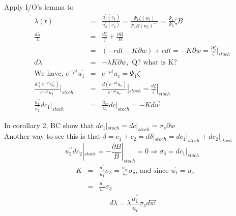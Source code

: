 \documentclass[]{article}
\begin{document}
Apply I/O's lemma to 
\begin{eqnarray*}
\lambda(t) &=& \frac{u_1^\prime(c_1^\prime)}{u_2^\prime(c_2^\prime)} = \frac{\Psi_1 \zeta(w_t)}{\Psi_2B(w_t)^{-1}} = \frac{\Psi_1}{\Psi_2} \zeta B\\
\frac{d\lambda}{\lambda} &=& \frac{d\zeta}{\zeta} + \frac{\partial B}{B}\\
&=& (-r dt - K\partial w) + rdt = -K\partial w = \frac{\partial \zeta}{\zeta}|_{stoch}\\
d\lambda &=& -\lambda K \partial w, \mbox{ Q? what is K?}\\
\mbox{We have, } e^{-\rho t} u_1^\prime &=& e^{-\rho t} u_c = \Psi_1 \zeta\\
\frac{d(e^{-\rho t}u_1^\prime)}{e^{-\rho t}u_1^\prime}|_{stoch} &=& \frac{d(e^{-\rho t}u_c)}{e^{-\rho t}u_c}|_{stoch} = \frac{d\zeta}{\zeta}|_{stoch}\\
\frac{u_1^{\prime\prime}}{u_1^\prime}dc_1|_{stoch}&=& \frac{u_{cc}}{u_c}dc|_{stoch} = -Kd\vec{w}
\end{eqnarray*}

In corollary 2, BC show that $dc_1|_{stoch} = dc|_{stoch} = \sigma_s \partial w$\\
Another way to see this is that $\delta = c_1+c_2 = d\delta|_{stoch} = dc_1|_{stoch} + dc_2|_{stoch}$
\begin{equation}
u_2^{\prime\prime} dc_2|_{stoch} = -\frac{\partial B}{B}|_{stoch} = 0 \Rightarrow \sigma_\delta = dc_1|_{stoch} \tag{22}
\end{equation}
\begin{eqnarray*}
-K&=& \frac{u_1^{\prime\prime}}{u_1^\prime} \sigma_\delta = \frac{u_{cc}}{u_c}\sigma_\delta \mbox{, and since } u_1^\prime = u_c\\
&=& \frac{u_1^{\prime\prime}}{u_c} \sigma_\delta
\end{eqnarray*}
\begin{equation}
d\lambda = \lambda \frac{u_1^{\prime\prime}}{u_c} \sigma_\delta d\vec{w} \tag{23}
\end{equation}
\end{document}
